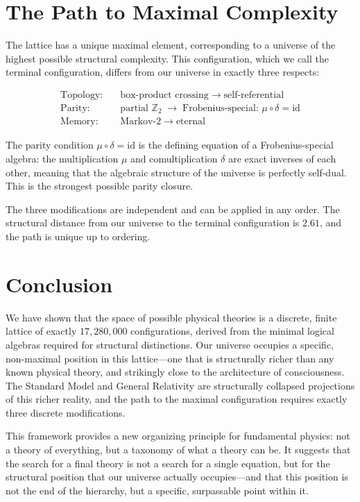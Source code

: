 \documentclass[11pt,a4paper]{article}
\theoremstyle{definition}
\begin{document}
\section{The Path to Maximal Complexity}

The lattice has a unique maximal element, corresponding to a universe of the highest possible structural complexity. This configuration, which we call the terminal configuration, differs from our universe in exactly three respects:

\begin{align*}
\text{Topology:} &\quad \text{box-product crossing} \;\longrightarrow\; \text{self-referential}\\
\text{Parity:} &\quad \text{partial } \mathbb{Z}_2 \;\longrightarrow\; \text{Frobenius-special: } \mu \circ \delta = \mathrm{id}\\
\text{Memory:} &\quad \text{Markov-2} \;\longrightarrow\; \text{eternal}
\end{align*}

The parity condition \(\mu \circ \delta = \mathrm{id}\) is the defining equation of a Frobenius-special algebra: the multiplication \(\mu\) and comultiplication \(\delta\) are exact inverses of each other, meaning that the algebraic structure of the universe is perfectly self-dual. This is the strongest possible parity closure.

The three modifications are independent and can be applied in any order. The structural distance from our universe to the terminal configuration is \(2.61\), and the path is unique up to ordering.

\section{Conclusion}

We have shown that the space of possible physical theories is a discrete, finite lattice of exactly \(17,280,000\) configurations, derived from the minimal logical algebras required for structural distinctions. Our universe occupies a specific, non-maximal position in this lattice---one that is structurally richer than any known physical theory, and strikingly close to the architecture of consciousness. The Standard Model and General Relativity are structurally collapsed projections of this richer reality, and the path to the maximal configuration requires exactly three discrete modifications.

This framework provides a new organizing principle for fundamental physics: not a theory of everything, but a taxonomy of what a theory can be. It suggests that the search for a final theory is not a search for a single equation, but for the structural position that our universe actually occupies---and that this position is not the end of the hierarchy, but a specific, surpassable point within it.
\end{document}
